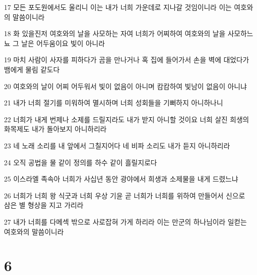 \par 17 모든 포도원에서도 울리니 이는 내가 너희 가운데로 지나갈 것임이니라 이는 여호와의 말씀이니라
\par 18 화 있을진저 여호와의 날을 사모하는 자여 너희가 어찌하여 여호와의 날을 사모하느뇨 그 날은 어두움이요 빛이 아니라
\par 19 마치 사람이 사자를 피하다가 곰을 만나거나 혹 집에 들어가서 손을 벽에 대었다가 뱀에게 물림 같도다
\par 20 여호와의 날이 어찌 어두워서 빛이 없음이 아니며 캄캄하여 빛남이 없음이 아니냐
\par 21 내가 너희 절기를 미워하여 멸시하며 너희 성회들을 기뻐하지 아니하나니
\par 22 너희가 내게 번제나 소제를 드릴지라도 내가 받지 아니할 것이요 너희 살진 희생의 화목제도 내가 돌아보지 아니하리라
\par 23 네 노래 소리를 내 앞에서 그칠지어다 네 비파 소리도 내가 듣지 아니하리라
\par 24 오직 공법을 물 같이 정의를 하수 같이 흘릴지로다
\par 25 이스라엘 족속아 너희가 사십년 동안 광야에서 희생과 소제물을 내게 드렸느냐
\par 26 너희가 너희 왕 식굿과 너희 우상 기윤 곧 너희가 너희를 위하여 만들어서 신으로 삼은 별 형상을 지고 가리라
\par 27 내가 너희를 다메섹 밖으로 사로잡혀 가게 하리라 이는 만군의 하나님이라 일컫는 여호와의 말씀이니라

\chapter{6}

